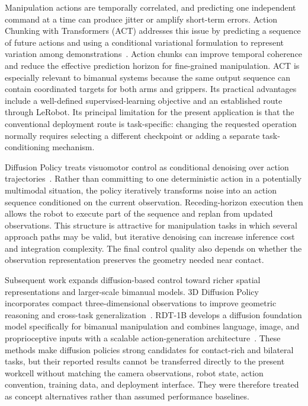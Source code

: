 Manipulation actions are temporally correlated, and predicting one independent command at a time can produce jitter or amplify short-term errors. Action Chunking with Transformers (ACT) addresses this issue by predicting a sequence of future actions and using a conditional variational formulation to represent variation among demonstrations~\cite{act}. Action chunks can improve temporal coherence and reduce the effective prediction horizon for fine-grained manipulation. ACT is especially relevant to bimanual systems because the same output sequence can contain coordinated targets for both arms and grippers. Its practical advantages include a well-defined supervised-learning objective and an established route through LeRobot. Its principal limitation for the present application is that the conventional deployment route is task-specific: changing the requested operation normally requires selecting a different checkpoint or adding a separate task-conditioning mechanism.

Diffusion Policy treats visuomotor control as conditional denoising over action trajectories~\cite{diffusionpolicy}. Rather than committing to one deterministic action in a potentially multimodal situation, the policy iteratively transforms noise into an action sequence conditioned on the current observation. Receding-horizon execution then allows the robot to execute part of the sequence and replan from updated observations. This structure is attractive for manipulation tasks in which several approach paths may be valid, but iterative denoising can increase inference cost and integration complexity. The final control quality also depends on whether the observation representation preserves the geometry needed near contact.

Subsequent work expands diffusion-based control toward richer spatial representations and larger-scale bimanual models. 3D Diffusion Policy incorporates compact three-dimensional observations to improve geometric reasoning and cross-task generalization~\cite{dp3}. RDT-1B develops a diffusion foundation model specifically for bimanual manipulation and combines language, image, and proprioceptive inputs with a scalable action-generation architecture~\cite{rdt1b}. These methods make diffusion policies strong candidates for contact-rich and bilateral tasks, but their reported results cannot be transferred directly to the present workcell without matching the camera observations, robot state, action convention, training data, and deployment interface. They were therefore treated as concept alternatives rather than assumed performance baselines.

